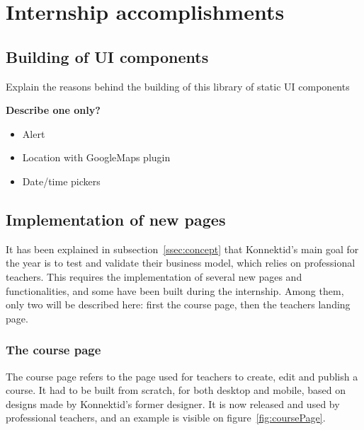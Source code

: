 \section{Internship accomplishments}
\label{sec:accomplish}

\subsection{Building of UI components}
\label{ssec:ui_components}

Explain the reasons behind the building of this library of static UI components

\textbf{Describe one only?}

\begin{itemize}
    \item Alert
    \item Location with GoogleMaps plugin
    \item Date/time pickers
\end{itemize}

\subsection{Implementation of new pages}
\label{ssec:new_pages}

It has been explained in {\sc subsection}~\ref{ssec:concept} that Konnektid's main goal for the year is to test and validate their business model, which relies on
professional teachers. This requires the implementation of several new pages and functionalities, and some have been built during the internship. Among them, only
two will be described here: first the course page, then the teachers landing page.

\subsubsection{The course page}
\label{sssec:coursePage}

The course page refers to the page used for teachers to create, edit and publish a course. It had to be built from scratch, for both desktop and mobile, based on designs
made by Konnektid's former designer. It is now released and used by professional teachers, and an example is visible on {\sc figure}~\ref{fig:coursePage}.

